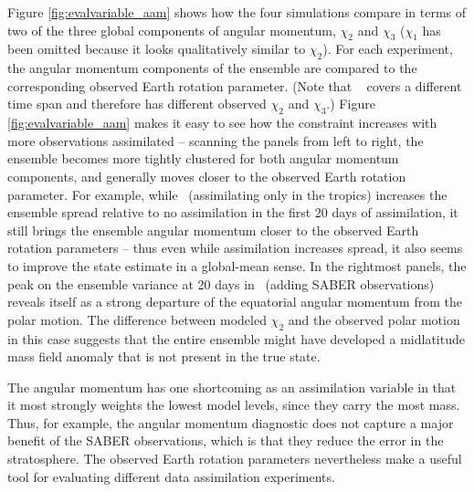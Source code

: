 Figure \ref{fig:evalvariable_aam} shows how the four simulations compare in terms of two of the three global components of angular momentum, $\chi_2$ and $\chi_3$ ($\chi_1$ has been omitted because it looks qualitatively similar to $\chi_2$).  
For each experiment, the angular momentum components of the ensemble are compared  to the corresponding observed Earth rotation parameter. 
(Note that \NCARFULL~ covers a different time span and therefore has different observed $\chi_2$ and $\chi_3$.)
Figure  \ref{fig:evalvariable_aam} makes it easy to see how the constraint increases with more observations assimilated -- scanning the panels from left to right, the ensemble becomes more tightly clustered for both angular momentum components, and generally moves closer to the observed Earth rotation parameter. 
For example, while \WACCMTROPICS~(assimilating only in the tropics) increases the ensemble spread relative to no assimilation in the first 20 days of assimilation, it still brings the ensemble angular momentum closer to the observed Earth rotation parameters -- thus even while assimilation increases spread, it also seems to improve the state estimate in a global-mean sense.  
In the rightmost panels, the peak on the ensemble variance at 20 days in \NCARFULL~(adding SABER observations) reveals itself as a strong departure of the equatorial angular momentum from the polar motion.   
The difference between modeled $\chi_2$ and the observed polar motion in this case suggests that the entire ensemble might have developed a midlatitude mass field anomaly that is not present in the true state. 

The angular momentum has one shortcoming as an assimilation variable in that it most strongly weights the lowest model levels, since they carry the most mass. 
Thus, for example, the angular momentum diagnostic does not capture a major benefit of the SABER observations, which is that they reduce the error in the stratosphere. 
The observed Earth rotation parameters nevertheless make a useful tool for evaluating different data assimilation experiments. 
